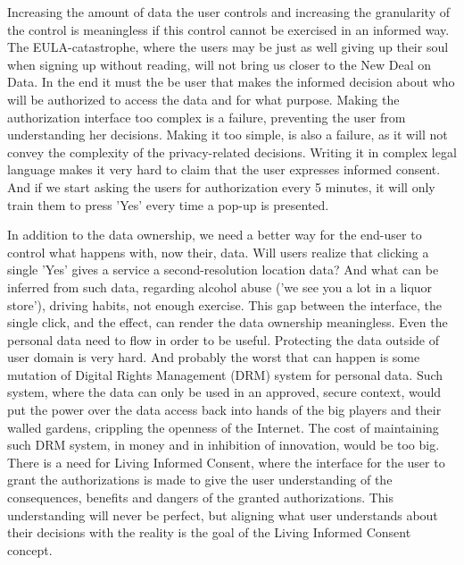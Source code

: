 Increasing the amount of data the user controls and increasing the granularity of the control is meaningless if this control cannot be exercised in an informed way.
The EULA-catastrophe, where the users may be just as well giving up their soul when signing up without reading, will not bring us closer to the New Deal on Data.
In the end it must the be user that makes the informed decision about who will be authorized to access the data and for what purpose. 
Making the authorization interface too complex is a failure, preventing the user from understanding her decisions. 
Making it too simple, is also a failure, as it will not convey the complexity of the privacy-related decisions. 
Writing it in complex legal language makes it very hard to claim that the user expresses informed consent. 
And if we start asking the users for authorization every 5 minutes, it will only train them to press 'Yes' every time a pop-up is presented. 

In addition to the data ownership, we need a better way for the end-user to control what happens with, now their, data. 
Will users realize that clicking a single 'Yes' gives a service a second-resolution location data? 
And what can be inferred from such data, regarding alcohol abuse ('we see you a lot in a liquor store'), driving habits, not enough exercise. 
This gap between the interface, the single click, and the effect, can render the data ownership meaningless.
Even the personal data need to flow in order to be useful.
Protecting the data outside of user domain is very hard.
And probably the worst that can happen is some mutation of Digital Rights Management (DRM) system for personal data.
Such system, where the data can only be used in an approved, secure context, would put the power over the data access back into hands of the big players and their walled gardens, crippling the openness of the Internet.
The cost of maintaining such DRM system, in money and in inhibition of innovation, would be too big. 
There is a need for Living Informed Consent, where the interface for the user to grant the authorizations is made to give the user understanding of the consequences, benefits and dangers of the granted authorizations.
This understanding will never be perfect, but aligning what user understands about their decisions with the reality is the goal of the Living Informed Consent concept. 

